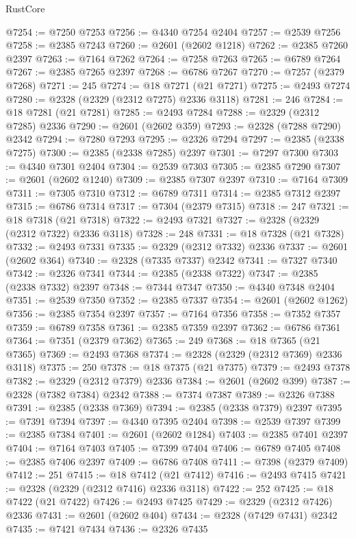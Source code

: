 \begin{lexlean}{RustCore}
\begin{coremodule}
@7254 := @7250 @7253
@7256 := @4340 @7254 @2404
@7257 := @2539 @7256
@7258 := @2385 @7243
@7260 := @2601 (@2602 @1218)
@7262 := @2385 @7260 @2397
@7263 := @7164 @7262
@7264 := @7258 @7263
@7265 := @6789 @7264
@7267 := @2385 @7265 @2397
@7268 := @6786 @7267
@7270 := @7257 (@2379 @7268)
@7271 := 245
@7274 := @18 @7271 (@21 @7271)
@7275 := @2493 @7274
@7280 := @2328 (@2329 (@2312 @7275) @2336 @3118)
@7281 := 246
@7284 := @18 @7281 (@21 @7281)
@7285 := @2493 @7284
@7288 := @2329 (@2312 @7285) @2336
@7290 := @2601 (@2602 @359)
@7293 := @2328 (@7288 @7290) @2342
@7294 := @7280 @7293
@7295 := @2326 @7294
@7297 := @2385 (@2338 @7275)
@7300 := @2385 (@2338 @7285) @2397
@7301 := @7297 @7300
@7303 := @4340 @7301 @2404
@7304 := @2539 @7303
@7305 := @2385 @7290
@7307 := @2601 (@2602 @1240)
@7309 := @2385 @7307 @2397
@7310 := @7164 @7309
@7311 := @7305 @7310
@7312 := @6789 @7311
@7314 := @2385 @7312 @2397
@7315 := @6786 @7314
@7317 := @7304 (@2379 @7315)
@7318 := 247
@7321 := @18 @7318 (@21 @7318)
@7322 := @2493 @7321
@7327 := @2328 (@2329 (@2312 @7322) @2336 @3118)
@7328 := 248
@7331 := @18 @7328 (@21 @7328)
@7332 := @2493 @7331
@7335 := @2329 (@2312 @7332) @2336
@7337 := @2601 (@2602 @364)
@7340 := @2328 (@7335 @7337) @2342
@7341 := @7327 @7340
@7342 := @2326 @7341
@7344 := @2385 (@2338 @7322)
@7347 := @2385 (@2338 @7332) @2397
@7348 := @7344 @7347
@7350 := @4340 @7348 @2404
@7351 := @2539 @7350
@7352 := @2385 @7337
@7354 := @2601 (@2602 @1262)
@7356 := @2385 @7354 @2397
@7357 := @7164 @7356
@7358 := @7352 @7357
@7359 := @6789 @7358
@7361 := @2385 @7359 @2397
@7362 := @6786 @7361
@7364 := @7351 (@2379 @7362)
@7365 := 249
@7368 := @18 @7365 (@21 @7365)
@7369 := @2493 @7368
@7374 := @2328 (@2329 (@2312 @7369) @2336 @3118)
@7375 := 250
@7378 := @18 @7375 (@21 @7375)
@7379 := @2493 @7378
@7382 := @2329 (@2312 @7379) @2336
@7384 := @2601 (@2602 @399)
@7387 := @2328 (@7382 @7384) @2342
@7388 := @7374 @7387
@7389 := @2326 @7388
@7391 := @2385 (@2338 @7369)
@7394 := @2385 (@2338 @7379) @2397
@7395 := @7391 @7394
@7397 := @4340 @7395 @2404
@7398 := @2539 @7397
@7399 := @2385 @7384
@7401 := @2601 (@2602 @1284)
@7403 := @2385 @7401 @2397
@7404 := @7164 @7403
@7405 := @7399 @7404
@7406 := @6789 @7405
@7408 := @2385 @7406 @2397
@7409 := @6786 @7408
@7411 := @7398 (@2379 @7409)
@7412 := 251
@7415 := @18 @7412 (@21 @7412)
@7416 := @2493 @7415
@7421 := @2328 (@2329 (@2312 @7416) @2336 @3118)
@7422 := 252
@7425 := @18 @7422 (@21 @7422)
@7426 := @2493 @7425
@7429 := @2329 (@2312 @7426) @2336
@7431 := @2601 (@2602 @404)
@7434 := @2328 (@7429 @7431) @2342
@7435 := @7421 @7434
@7436 := @2326 @7435

\end{coremodule}
\end{lexlean}
